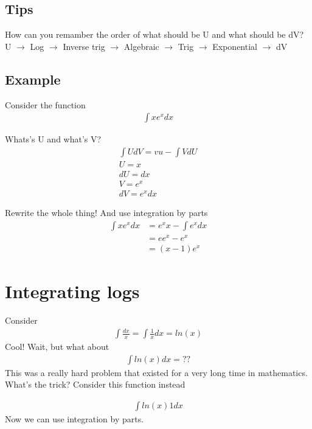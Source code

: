 \documentclass{article}
\begin{document}
\subsection{Tips}
How can you remamber the order of what should be U and what should be dV? \\
U $\rightarrow$ Log $\rightarrow$ Inverse trig $\rightarrow$ Algebraic $\rightarrow$ Trig $\rightarrow$ Exponential $\rightarrow$ dV \\


\subsection{Example}
Consider the function 
\begin{align}
    \int x  e^x dx
\end{align}

Whats's U and what's V? 
\begin{align}
    \int U dV = vu - \int V dU\\
    U = x\\
    dU = dx \\
    V = e^x\\
    dV = e^x dx
\end{align}

Rewrite the whole thing! And use integration by parts
\begin{align}
    \int x e^x dx &= e^x x - \int e^x dx \\
    &= e e^x - e^x \\
    &= (x - 1) e^x
\end{align}


\section{Integrating logs}

Consider 
\begin{align}
    \int \frac{dx}{x} = \int \frac{1}{x} dx = ln(x)
\end{align}
Cool! Wait, but what about
\begin{align}
    \int ln(x) dx = ??
\end{align}
This was a really hard problem that existed for a very long time in mathematics. What's the trick? Consider this function instead 

\begin{align}
    \int ln(x) 1 dx 
\end{align}
Now we can use integration by parts.
\end{document}
